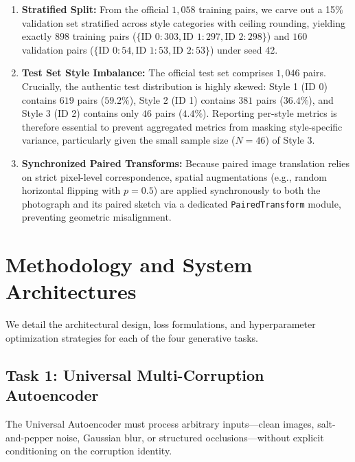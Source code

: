 \documentclass[conference]{IEEEtran}
\begin{document}
\begin{enumerate}
    \item \textbf{Stratified Split:} From the official $1,058$ training pairs, we carve out a 15\% validation set stratified across style categories with ceiling rounding, yielding exactly $898$ training pairs ($\{\text{ID 0}: 303, \text{ID 1}: 297, \text{ID 2}: 298\}$) and $160$ validation pairs ($\{\text{ID 0}: 54, \text{ID 1}: 53, \text{ID 2}: 53\}$) under seed 42.
    \item \textbf{Test Set Style Imbalance:} The official test set comprises $1,046$ pairs. Crucially, the authentic test distribution is highly skewed: Style 1 (ID 0) contains $619$ pairs ($59.2\%$), Style 2 (ID 1) contains $381$ pairs ($36.4\%$), and Style 3 (ID 2) contains only $46$ pairs ($4.4\%$). Reporting per-style metrics is therefore essential to prevent aggregated metrics from masking style-specific variance, particularly given the small sample size ($N=46$) of Style 3.
    \item \textbf{Synchronized Paired Transforms:} Because paired image translation relies on strict pixel-level correspondence, spatial augmentations (e.g., random horizontal flipping with $p=0.5$) are applied synchronously to both the photograph and its paired sketch via a dedicated \texttt{PairedTransform} module, preventing geometric misalignment.
\end{enumerate}

\section{Methodology and System Architectures}
We detail the architectural design, loss formulations, and hyperparameter optimization strategies for each of the four generative tasks.

\subsection{Task 1: Universal Multi-Corruption Autoencoder}
The Universal Autoencoder must process arbitrary inputs—clean images, salt-and-pepper noise, Gaussian blur, or structured occlusions—without explicit conditioning on the corruption identity.
\end{document}
